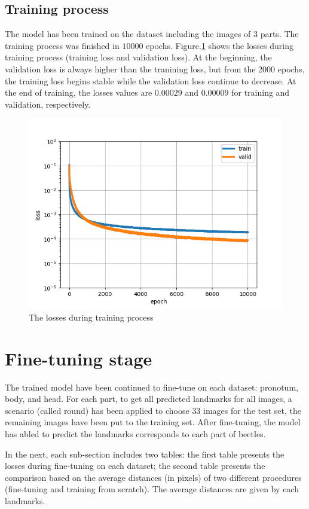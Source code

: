 \documentclass[12pt,a4paper]{article}
\begin{document}
\subsection{Training process}
The model has been trained on the dataset including the images of 3 parts. The training process was finished in $10000$ epochs. Figure.\ref{ptlosses} shows the losses during training process (training loss and validation loss). At the beginning, the validation loss is always higher than the tranining loss, but from the 2000 epochs, the training loss begins stable while the validation loss continue to decrease. At the end of training, the losses values are $0.00029$ and $0.00009$ for training and validation, respectively.
\begin{figure}[h!]
	\centering
	\includegraphics[scale=0.7]{images/fine_tuning/all_parts_10000epochs}
	\caption{The losses during training process}
	\label{ptlosses}
\end{figure}

\section{Fine-tuning stage}
The trained model have been continued to fine-tune\cite{} on each dataset: pronotum, body, and head. For each part, to get all predicted landmarks for all images, a scenario (called round) has been applied to choose $33$ images for the test set, the remaining images have been put to the training set. After fine-tuning, the model has abled to predict the landmarks corresponds to each part of beetles.

In the next, each sub-section includes two tables: the first table presents the losses during fine-tuning on each dataset; the second table presents the comparison based on the average distances (in pixels) of two different procedures (fine-tuning and training from scratch). The average distances are given by each landmarks.
\end{document}
